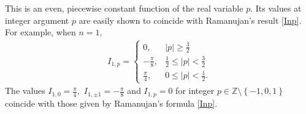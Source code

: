 \documentclass[11pt,oneside,reqno]{article}
\theoremstyle{definition}
\begin{document}
This is an even, piecewise constant function of the real variable $p$. Its values at integer argument $p$ are easily shown to coincide with Ramanujan's result \eqref{Inp}. For example, when $n=1,$
\begin{align}
I_{1,p}=
\begin{cases}
0, & \vert p\vert \ge\frac{3}{2}\\
-\frac{\pi}{8}, & \frac{1}{2}\le \vert p\vert <\frac{3}{2}\\
\frac{\pi}{4}, & 0\le \vert p\vert <\frac{1}{2}.
\end{cases}
\end{align}
The values $I_{1,0}=\frac{\pi}{4},$ $I_{1,\pm 1}=-\frac{\pi}{8}$ and $I_{1,p}=0$ for integer $p\in \mathbb{Z} \setminus \left\{-1,0,1\right\}$ coincide with those given by Ramanujan's formula \eqref{Inp}.
\end{document}
